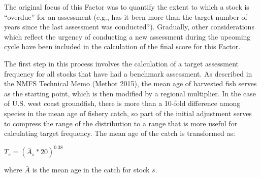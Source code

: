 \documentclass[11pt,
  english,
  a4paper,
]{article}
\begin{document}
\leavevmode\tagmcend\tagstructend


The original focus of this Factor was to quantify the extent to which a stock is ``overdue'' for an assessment (e.g., has it been more than the target number of years since the last assessment was conducted?). Gradually, other considerations which reflect the urgency of conducting a new assessment during the upcoming cycle have been included in the calculation of the final score for this Factor.

\leavevmode\tagmcend\tagstructend\par


The first step in this process involves the calculation of a target assessment frequency for all stocks that have had a benchmark assessment. As described in the NMFS Technical Memo {(Methot 2015)\leavevmode\tagmcend\tagstructend}, the mean age of harvested fish serves as the starting point, which is then modified by a regional multiplier. In the case of U.S. west coast groundfish, there is more than a 10-fold difference among species in the mean age of fishery catch, so part of the initial adjustment serves to compress the range of the distribution to a range that is more useful for calculating target frequency. The mean age of the catch is transformed as:

\leavevmode\tagmcend\tagstructend\par

\begin{centering}

  $T_s = (\bar{A}_s*20)^{0.38}$

\end{centering}


where {\(\bar{A}\)\leavevmode\tagmcend\tagstructend} is the mean age in the catch for stock {\(s\)\leavevmode\tagmcend\tagstructend}.

\leavevmode\tagmcend\tagstructend\par

\end{document}
